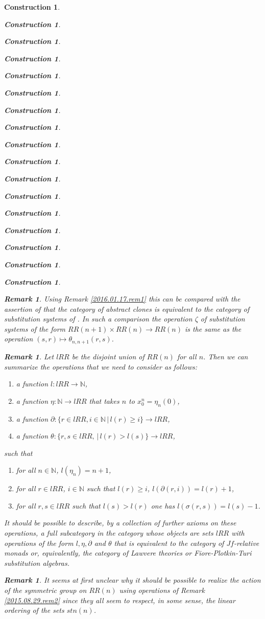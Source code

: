 \documentclass[onecolumn,12pt]{amsart}
\newtheorem{remark}[proposition]{Remark}
\numberwithin{proposition}{subsection}
\newtheorem{construction}[proposition]{Construction}
\newcommand{\sr}{\rightarrow}
\newcommand{\nn}{{\mathbb N}}
\newcommand{\nat}{\nn}
\begin{document}
\begin{construction}
\begin{construction}
\begin{construction}
\begin{construction}
\begin{construction}
\begin{construction}
\begin{construction}
\begin{construction}
\begin{construction}
\begin{construction}
\begin{construction}
\begin{construction}
\begin{construction}
\begin{construction}
\begin{construction}
\begin{construction}
\begin{construction}
\begin{remark}
Using Remark \ref{2016.01.17.rem1} this can be compared with the assertion of
\cite[Theorem 3.3]{FPT} that the category of abstract clones is equivalent to
the category of substitution systems of \cite[Definition 3.1]{FPT}. In such a
comparison the operation $\zeta$ of substitution systems of the form
$RR(n+1)\times RR(n)\sr RR(n)$ is the same as the operation $(s,r)\mapsto
\theta_{n,n+1}(r,s)$.
\end{remark}
%
\begin{remark}\rm
\label{2015.08.29.rem1}
Let $lRR$ be the disjoint union of $RR(n)$ for all $n$. Then we can summarize the operations that we need to consider as follows: 
%
\begin{enumerate}
\item a function $l:lRR\sr\nat$,
\item a function $\eta:\nat\sr lRR$ that takes $n$ to $x^n_0=\eta_{n}(0)$,
\item a function $\partial:\{r\in lRR, i\in\nat\,|\, l(r)\ge i\}\sr lRR$,
\item a function $\theta:\{r,s\in lRR,\,|\,l(r)>l(s)\}\sr lRR$,
\end{enumerate}
%
such that
%
\begin{enumerate}
\item for all $n\in\nat$, $l(\eta_{n})=n+1$,
\item for all $r\in lRR$, $i\in\nat $ such that $l(r)\ge i$, $l(\partial(r,i))=l(r)+1$,
\item for all $r,s\in lRR$ such that $l(s)>l(r)$ one has $l(\sigma(r,s))=l(s)-1$.
\end{enumerate}
%
It should be possible to describe, by a collection of further axioms on these
operations, a full subcategory in the category whose objects are sets $lRR$
with operations of the form $l,\eta,\partial$ and $\theta$ that is equivalent
to the category of $Jf$-relative monads or, equivalently, the category of
Lawvere theories or Fiore-Plotkin-Turi substitution algebras.
\end{remark}
%
\begin{remark}\rm
\label{2015.08.29.rem1b} It seems at first unclear why it should be possible
to realize the action of the symmetric group on $RR(n)$ using operations of
Remark \ref{2015.08.29.rem2} since they all seem to respect, in some sense, the
linear ordering of the sets $stn(n)$.


\end{remark}
\end{construction}
\end{construction}
\end{construction}
\end{construction}
\end{construction}
\end{construction}
\end{construction}
\end{construction}
\end{construction}
\end{construction}
\end{construction}
\end{construction}
\end{construction}
\end{construction}
\end{construction}
\end{construction}
\end{construction}
\end{document}
